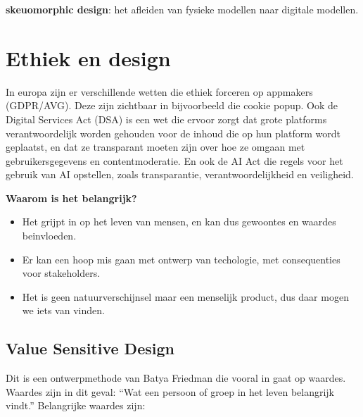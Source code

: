 \documentclass[nonacm, sigconf, balance=true]{acmart}
\begin{document}
    \textbf{skeuomorphic design}: het afleiden van fysieke modellen naar digitale modellen.


    \section{Ethiek en design}

    In europa zijn er verschillende wetten die ethiek forceren op appmakers (GDPR/AVG).
    Deze zijn zichtbaar in bijvoorbeeld die cookie popup.
    Ook de Digital Services Act (DSA) is een wet die ervoor zorgt dat grote platforms verantwoordelijk worden gehouden voor de inhoud die op hun platform wordt geplaatst, en dat ze transparant moeten zijn over hoe ze omgaan met gebruikersgegevens en contentmoderatie.
    En ook de AI Act die regels voor het gebruik van AI opstellen, zoals transparantie, verantwoordelijkheid en veiligheid.

    \textbf{Waarom is het belangrijk?}

    \begin{itemize}
        \item Het grijpt in op het leven van mensen, en kan dus gewoontes en waardes beinvloeden.
        \item Er kan een hoop mis gaan met ontwerp van techologie, met consequenties voor stakeholders.
        \item Het is geen natuurverschijnsel maar een menselijk product, dus daar mogen we iets van vinden.
    \end{itemize}

    \subsection{Value Sensitive Design}
    Dit is een ontwerpmethode van Batya Friedman die vooral in gaat op waardes.
    Waardes zijn in dit geval: ``Wat een persoon of groep in het leven belangrijk vindt.''
    Belangrijke waardes zijn:
\end{document}
